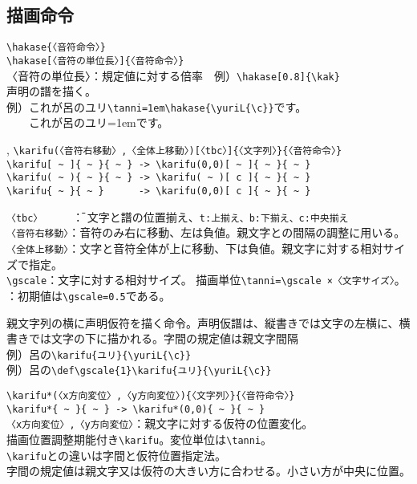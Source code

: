 \documentclass[a4paper,luatex]{l3doc}
\begin{document}
\subsection{描画命令}
\begin{function}{\hakase}
 \verb|\hakase{〈音符命令〉}|\\
 \verb|\hakase[〈音符の単位長〉]{〈音符命令〉}|\\
〈音符の単位長〉：規定値に対する倍率　例）\verb|\hakase[0.8]{\kak}|\\
 声明の譜を描く。\\
例）これが呂のユリ\verb|\tanni=1em\hakase{\yuriL{\c}}|です。\\
　　これが呂のユリ\tanni=1em\hakase{\yuriL{\c}}です。
\end{function}
\begin{function}{\karifu,\gscale}
 \verb|\karifu(〈音符右移動〉,〈全体上移動〉)[〈tbc〉]{〈文字列〉}{〈音符命令〉}|\\
 \verb|\karifu[ ~ ]{ ~ }{ ~ } -> \karifu(0,0)[ ~ ]{ ~ }{ ~ }|\\
 \verb|\karifu( ~ ){ ~ }{ ~ } -> \karifu( ~ )[ c ]{ ~ }{ ~ }|\\
 \verb|\karifu{ ~ }{ ~ }      -> \karifu(0,0)[ c ]{ ~ }{ ~ }|
\begin{tabbing}
 \verb|〈tbc〉　　　 |\=： 文字と譜の位置揃え、\verb|t:上揃え、b:下揃え、c:中央揃え|\\
 \verb|〈音符右移動〉|\>：音符のみ右に移動、左は負値。親文字との間隔の調整に用いる。\\
 \verb|〈全体上移動〉|\>：文字と音符全体が上に移動、下は負値。親文字に対する相対サイズで指定。\\
 \verb|\gscale|\>：文字に対する相対サイズ。
 描画単位\verb|\tanni=\gscale ×〈文字サイズ〉|。\\
 \>：初期値は\verb|\gscale=0.5|である。
\end{tabbing}
親文字列の横に声明仮符を描く命令。声明仮譜は、縦書きでは文字の左横に、横書きでは文字の下に描かれる。字間の規定値は親文字間隔\\
例）呂の\verb|\karifu{ユリ}{\yuriL{\c}}|
\hspace{2em}\\
例）呂の\verb|\def\gscale{1}\karifu{ユリ}{\yuriL{\c}}|
\hspace{2em}
\end{function}
\begin{function}{\karifu*}
 \verb|\karifu*(〈x方向変位〉,〈y方向変位〉){〈文字列〉}{〈音符命令〉}|\\
 \verb|\karifu*{ ~ }{ ~ } -> \karifu*(0,0){ ~ }{ ~ }|\\
 \verb|〈x方向変位〉,〈y方向変位〉|：親文字に対する仮符の位置変化。\\
描画位置調整期能付き\verb|\karifu|。変位単位は\verb|\tanni|。\\
\verb|\karifu|との違いは字間と仮符位置指定法。\\
字間の規定値は親文字又は仮符の大きい方に合わせる。小さい方が中央に位置。
\end{function}
\end{document}
